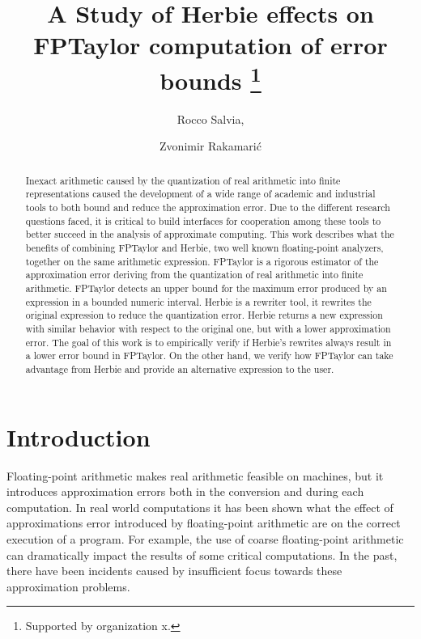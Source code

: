 \documentclass[runningheads]{llncs}
\begin{document}
%
\title{A Study of Herbie effects on FPTaylor computation of error bounds \thanks{Supported by organization x.}}
%
%
\author{Rocco Salvia, \and
Zvonimir Rakamari\'c}
%
%
%
\maketitle              %
%
\begin{abstract}
Inexact arithmetic caused by the quantization of real arithmetic into finite representations caused the development of a wide range of academic and industrial tools to both bound and reduce the approximation error. Due to the different research questions faced, it is critical to build interfaces for cooperation among these tools to better succeed in the analysis of approximate computing.
This work describes what the benefits of combining FPTaylor and Herbie, two well known floating-point analyzers, together on the same arithmetic expression. 
FPTaylor is a rigorous estimator of the approximation error deriving from the quantization of real arithmetic into finite arithmetic. FPTaylor detects an upper bound for the maximum error produced by an expression in a bounded numeric interval.
Herbie is a rewriter tool, it rewrites the original expression to reduce the quantization error. Herbie returns a new expression with similar behavior with respect to the original one, but with a lower approximation error. The goal of this work is to empirically verify if Herbie's rewrites always result in a lower error bound in FPTaylor. On the other hand, we verify how FPTaylor can take advantage from Herbie and provide an alternative expression to the user.

\end{abstract}

\section{Introduction} Floating-point arithmetic makes real arithmetic feasible on machines, but it introduces approximation errors both in the conversion and during each computation. In real world computations it has been shown what the effect of approximations error introduced by floating-point arithmetic are on the correct execution of a program. For example, the use of coarse floating-point arithmetic can dramatically impact the results of some critical computations. In the past, there have been incidents caused by insufficient focus towards these approximation problems.
\end{document}
